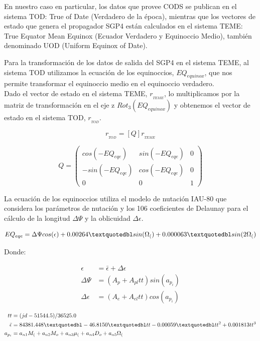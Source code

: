 En nuestro caso en particular, los datos que provee CODS se publican en el sistema TOD: True of Date (Verdadero de la \'epoca), mientras que los vectores de estado que genera el propagador SGP4 est\'an calculados en el sistema TEME: True Equator Mean Equinox (Ecuador Verdadero y Equinoccio Medio), tambi\'en denominado UOD (Uniform Equinox of Date).

Para la transformaci\'on de los datos de salida del SGP4 en el sistema TEME, al sistema TOD utilizamos la ecuaci\'on de los equinoccios, $EQ_{equinox}$, que nos permite transformar el equinoccio medio en el equinoccio verdadero.\\
Dado el vector de estado en el sistema TEME, $r_{_{TEME}}$, lo multiplicamos por la matriz de transformaci\'on en el eje z $Rot_{3}(EQ_{equinox})$ y obtenemos el vector de estado en el sistema TOD, $r_{_{TOD}}$.

\begin{equation}
 r_{_{TOD}} = [Q] r_{_{TEME}}
\end{equation}


 \[ Q =
\left( \begin{array}{ccc}
 cos(-EQ_{eqe}) & sin(-EQ_{eqe}) &  0 \\ 
 -sin(-EQ_{eqe}) & cos(-EQ_{eqe}) &  0 \\
 0 & 0 & 1
\end{array} \right) \] 


La ecuaci\'on de los equinoccios utiliza el modelo de nutaci\'on IAU-80 que considera los par\'ametros de nutaci\'on y los 106 coeficientes de Delaunay para el c\'alculo de la longitud $\Delta \Psi$ y la oblicuidad $\Delta \epsilon$.

\begin{equation}
 EQ_{eqe}=\Delta \Psi cos({\epsilon}) + 0.00264 \textquotedbl sin(\Omega_{(}) + 0.000063 \textquotedbl sin (2 \Omega_{(})
\end{equation}

Donde:

\begin{align*}
 \epsilon &= {\bar{\epsilon}} + \Delta \epsilon\\
 \Delta \Psi &= (A_{p} + A_{pl} tt) sin(a_{p_{i}})\\
 \Delta \epsilon &= (A_{e} + A_{el} tt) cos(a_{p_{i}})
\end{align*}

\begin{align*}
 tt &= (jd - 51544.5)/36525.0\\
 {\bar{\epsilon}} &= 84381.448 \textquotedbl - 46.8150 \textquotedbl tt - 0.00059 \textquotedbl tt^{2} + 0.001813 tt^{3}\\
 a_{p_{i}} &= a_{n1}M_{(}+a_{n2}M_{o}+a_{n3}\mu_{(}+a_{n4}D_{o}+a_{n5}\Omega_{(}
\end{align*}

